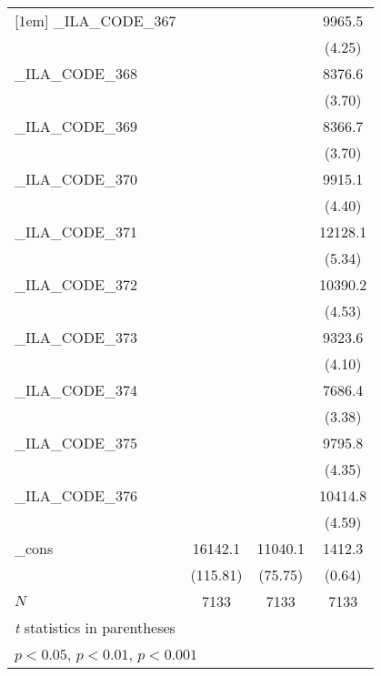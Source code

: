 {\begin{tabular}{l*{3}{c}}
[1em]
\_ILA\_CODE\_367&                     &                     &      9965.5\sym{***}\\
            &                     &                     &      (4.25)         \\
[1em]
\_ILA\_CODE\_368&                     &                     &      8376.6\sym{***}\\
            &                     &                     &      (3.70)         \\
[1em]
\_ILA\_CODE\_369&                     &                     &      8366.7\sym{***}\\
            &                     &                     &      (3.70)         \\
[1em]
\_ILA\_CODE\_370&                     &                     &      9915.1\sym{***}\\
            &                     &                     &      (4.40)         \\
[1em]
\_ILA\_CODE\_371&                     &                     &     12128.1\sym{***}\\
            &                     &                     &      (5.34)         \\
[1em]
\_ILA\_CODE\_372&                     &                     &     10390.2\sym{***}\\
            &                     &                     &      (4.53)         \\
[1em]
\_ILA\_CODE\_373&                     &                     &      9323.6\sym{***}\\
            &                     &                     &      (4.10)         \\
[1em]
\_ILA\_CODE\_374&                     &                     &      7686.4\sym{***}\\
            &                     &                     &      (3.38)         \\
[1em]
\_ILA\_CODE\_375&                     &                     &      9795.8\sym{***}\\
            &                     &                     &      (4.35)         \\
[1em]
\_ILA\_CODE\_376&                     &                     &     10414.8\sym{***}\\
            &                     &                     &      (4.59)         \\
[1em]
\_cons      &     16142.1\sym{***}&     11040.1\sym{***}&      1412.3         \\
            &    (115.81)         &     (75.75)         &      (0.64)         \\
\hline
\(N\)       &        7133         &        7133         &        7133         \\
\hline\hline
\multicolumn{4}{l}{\footnotesize \textit{t} statistics in parentheses}\\
\multicolumn{4}{l}{\footnotesize \sym{*} \(p<0.05\), \sym{**} \(p<0.01\), \sym{***} \(p<0.001\)}\\
\end{tabular}
}
